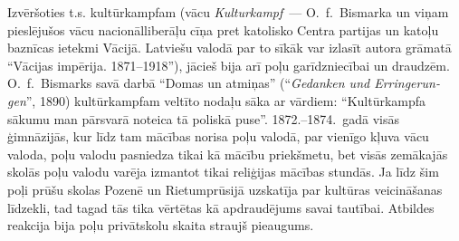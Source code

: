 \documentclass[twoside,a5paper,12pt,fleqn,openany]{extbook}
\newcommand{\detxti}[1]{\textit{\textgerman{#1}}}
\begin{document}
Izvēršoties t.s. kultūrkampfam (vācu \detxti{Kulturkampf}~--- O.~f.~Bismarka un viņam pieslējušos vācu nacionālliberāļu cīņa pret katolisko Centra partijas un katoļu baznīcas ietekmi Vācijā. Latviešu valodā par to sīkāk var izlasīt autora grāmatā ``Vācijas impērija. 1871--1918''), jācieš bija arī poļu garīdzniecībai un draudzēm. O.~f.~Bismarks savā darbā ``Domas un atmiņas'' (``\detxti{Gedanken und Erringerungen}'', 1890) kultūrkampfam veltīto nodaļu sāka ar vārdiem: ``Kultūrkampfa sākumu man pārsvarā noteica tā poliskā puse''. 1872.--1874.~gadā visās ģimnāzijās, kur līdz tam mācības norisa poļu valodā, par vienīgo kļuva vācu valoda, poļu valodu pasniedza tikai kā mācību priekšmetu, bet visās zemākajās skolās poļu valodu varēja izmantot tikai reliģijas mācības stundās. Ja līdz šim poļi prūšu skolas Pozenē un Rietumprūsijā uzskatīja par kultūras veicināšanas līdzekli, tad tagad tās tika vērtētas kā apdraudējums savai tautībai. Atbildes reakcija bija poļu privātskolu skaita straujš pieaugums.
\end{document}
